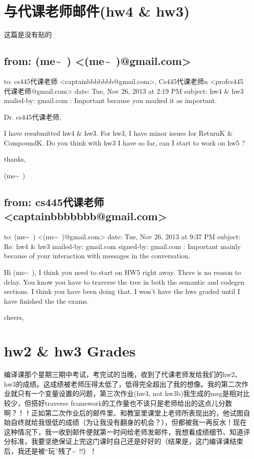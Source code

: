\documentclass[12pt]{book}
\begin{document}
\chapter{与代课老师邮件(hw4 \& hw3)}
\label{sec-39}
这篇是没有贴的
\section{from:         (me\textasciitilde{}~) <(me\textasciitilde{}~)@gmail.com>}
\label{sec-39-1}
to:         cs445代课老师 <captainbbbbbbb@gmail.com>,
 Cs445代课老师n <profcs445代课老师@gmail.com>
date:         Tue, Nov 26, 2013 at 2:19 PM
subject:         hw4 \& hw3
mailed-by:         gmail.com
:         Important because you marked it as important.

Dr. cs445代课老师, 

I have resubmitted hw4 \& hw3. For hw3, I have minor issues for ReturnK \& CompoundK. Do you think with hw3 I have so far, can I start to work on hw5 ?

thanks,

(me\textasciitilde{}~)

\section{from:         cs445代课老师 <captainbbbbbbb@gmail.com>}
\label{sec-39-2}
to:         (me\textasciitilde{}~) <(me\textasciitilde{}~)@gmail.com>
date:         Tue, Nov 26, 2013 at 9:37 PM
subject:         Re: hw4 \& hw3
mailed-by:         gmail.com
signed-by:         gmail.com
:         Important mainly because of your interaction with messages in the conversation.

Hi (me\textasciitilde{}~),
     I think you need to start on HW5 right away.   There is no reason to delay.   You know you have to 
traverse the tree in both the semantic and codegen sections.   I think you have been doing that.   I won't
have the hws graded until I have finished the the exams.

cheers,

\chapter{hw2 \& hw3 Grades}
\label{sec-40}

编译课那个星期三期中考试，考完试的当晚，收到了代课老师发给我们的hw2、hw3的成绩。这成绩被老师压得太低了，低得完全超出了我的想像。我的第二次作业就只有一个变量设置的问题，第三次作业(hw3, not hw3b)我生成的msg是相对比较少，但搭好traverse framework的工作量也不该只是老师给出的这点儿分数啊？！！正如第二次作业后的邮件里、和教室里课堂上老师所表现出的，他试图自始自终就给我很低的成绩（为让我没有翻身的机会？），但都被我一再反水！现在这种情况下，我一收到邮件便就第一时间给老师发邮件，我想看成绩细节、知道评分标准，我要坚绝保证上完这门课时自己还是好好的（结果是，这门编译课结束后，我还是被“玩”残了\textasciitilde{}~!!）！
\end{document}
